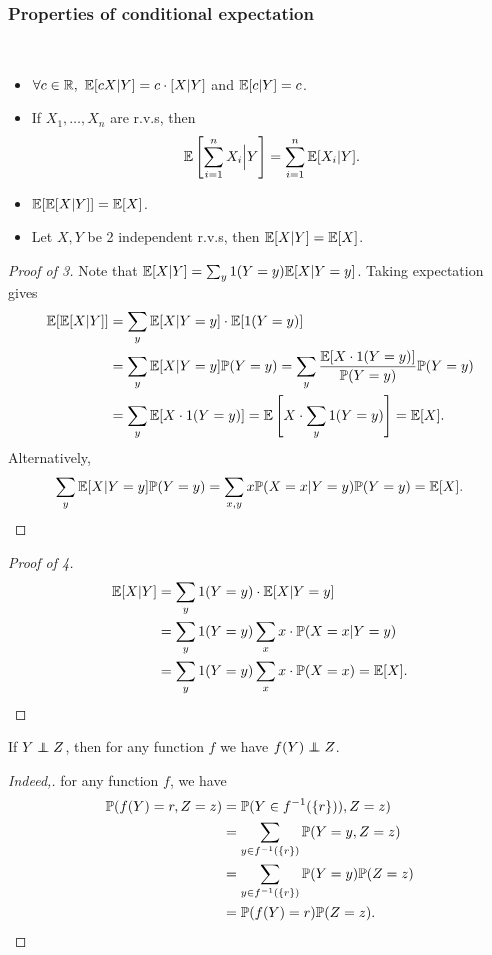 \subsubsection*{Properties of conditional expectation}
\begin{proposition}\label{prop:Properties of conditional expectation}\ 
    \begin{itemize}
        \item $ \forall c\in \mathbb{R},\ {\mathbb{E}}[cX|Y]=c \cdot [X|Y] $ and $ {\mathbb{E}}[c|Y]=c $.
        \item If $ X_1,\dots,X_n $ are r.v.s, then 
        \[
            {\mathbb{E}}\left[ \sum_{i=1}^{n}X_i\Big|Y \right] = \sum_{i=1}^{n} {\mathbb{E}}[X_i|Y].
        \]
        \item $ {\mathbb{E}}[{\mathbb{E}}[X|Y]]={\mathbb{E}}[X] $.
        \item Let $X,Y$ be 2 independent r.v.s, then $ {\mathbb{E}}[X|Y]={\mathbb{E}}[X] $.
    \end{itemize}
\end{proposition}
\begin{proof}[Proof of 3]
    Note that $ {\mathbb{E}}[X|Y]=\sum_{y} 1(Y=y){\mathbb{E}}[X|Y=y] $. Taking expectation gives 
    \begin{align*}
        {\mathbb{E}}[{\mathbb{E}}[X|Y]]&= \sum_{y} {\mathbb{E}}[X|Y=y] \cdot {\mathbb{E}}[1(Y=y)]\\
        &= \sum_{y} {\mathbb{E}}[X|Y=y] {\mathbb{P}}(Y=y) = \sum_{y} \frac{{\mathbb{E}}[X\cdot 1(Y=y)]}{{\mathbb{P}}(Y=y)}{\mathbb{P}}(Y=y)\\ 
        &= \sum_{y} {\mathbb{E}}[X\cdot 1(Y=y)] = {\mathbb{E}}\left[ X\cdot \sum_{y} 1(Y=y) \right] = {\mathbb{E}}[X].
    \end{align*}
    Alternatively,
    \[
        \sum_{y} {\mathbb{E}}[X|Y=y] {\mathbb{P}}(Y=y) = \sum_{x,y} x{\mathbb{P}}(X=x|Y=y)\mathbb{P}(Y=y)={\mathbb{E}}[X].\qedhere
    \]
\end{proof}
\begin{proof}[Proof of 4]
    \begin{align*}
        {\mathbb{E}}[X|Y]&= \sum_{y} 1(Y=y) \cdot {\mathbb{E}}[X|Y=y]\\ 
        &= \sum_{y} 1(Y=y) \sum_{x} x \cdot {\mathbb{P}}(X=x|Y=y)\\
        &= \sum_{y} 1(Y=y) \sum_{x} x \cdot \mathbb{P}(X=x) = {\mathbb{E}}[X].\qedhere
    \end{align*}
\end{proof}
\begin{lemma}\label{lma:2.25}
    If $ Y \independent Z $, then for any function $f$ we have $ f(Y) \independent Z $.
\end{lemma}
\begin{proof}[Indeed,]
    for any function $f$, we have
    \begin{align*}
        \mathbb{P}(f(Y)=r,Z=z)&= \mathbb{P}(Y\in f^{-1}(\{r\})), Z=z)\\ 
        &= \sum_{y\in f^{-1}(\{r\})} \mathbb{P}(Y=y,Z=z)\\ 
        &= \sum_{y\in f^{-1}(\{r\})} \mathbb{P}(Y=y) \mathbb{P}(Z=z)\\ 
        &= \mathbb{P}(f(Y)=r)\mathbb{P}(Z=z).\qedhere
    \end{align*}
\end{proof}
